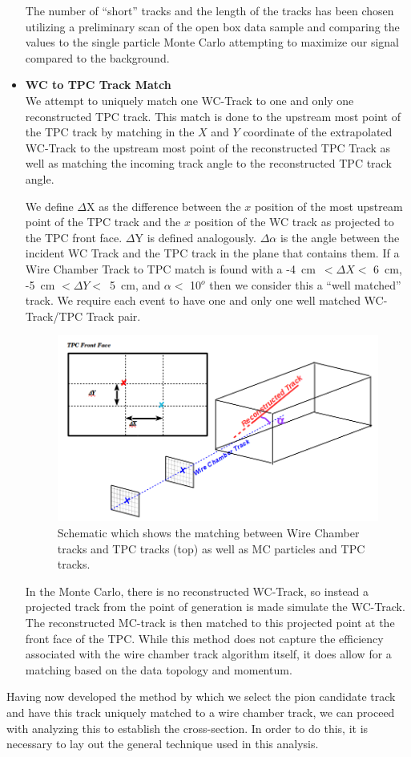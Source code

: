 \begin{itemize}
The number of ``short'' tracks and the length of the tracks has been chosen utilizing a preliminary scan of the open box data sample and comparing the values to the single particle Monte Carlo attempting to maximize our signal compared to the background.

\item{\textbf{WC to TPC Track Match}}\\

We attempt to uniquely match one WC-Track to one and only one reconstructed TPC track. This match is done to the upstream most point of the TPC track by matching in the $X$ and $Y$ coordinate of the extrapolated WC-Track to the upstream most point of the reconstructed TPC Track as well as matching the incoming track angle to the reconstructed TPC track angle.

We define $\Delta$X as the difference between the $x$ position of the most upstream point of the TPC track and the $x$ position of the WC track as projected to the TPC front face. $\Delta$Y is defined analogously. $\Delta\alpha$ is the angle between the incident WC Track and the TPC track in the plane that contains them. If a Wire Chamber Track to TPC match is found with a  -4~cm~$< \Delta X<$ 6~cm, -5~cm $ < \Delta Y< $~5~cm, and $\alpha < $ 10$^o$ then we consider this a ``well matched'' track. We require each event to have one and only one well matched WC-Track/TPC Track pair.

\begin{figure}[h!]
\centering
\includegraphics[scale=0.35]{./images/WCTPCMatchSchematic.png}
\caption{Schematic which shows the matching between Wire Chamber tracks and TPC tracks (top) as well as MC particles and TPC tracks.}
\label{fig:WCTrackMatching}
\end{figure}

In the Monte Carlo, there is no reconstructed WC-Track, so instead a projected track from the point of generation is made simulate the WC-Track. The reconstructed MC-track is then matched to this projected point at the front face of the TPC. While this method does not capture the efficiency associated with the wire chamber track algorithm itself, it does allow for a matching based on the data topology and momentum.

\end{itemize}

Having now developed the method by which we select the pion candidate track and have this track uniquely matched to a wire chamber track, we can proceed with analyzing this to establish the cross-section. In order to do this, it is necessary to lay out the general technique used in this analysis.
